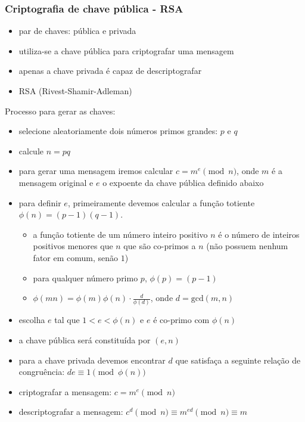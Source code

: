 \begin{frame}
\frametitle{Criptografia de chave pública - RSA}
\begin{itemize}
\item par de chaves: pública e privada
\item utiliza-se a chave pública para criptografar uma mensagem
\item apenas a chave privada é capaz de descriptografar
\item RSA (Rivest-Shamir-Adleman) 
\end{itemize}

\framebreak

Processo para gerar as chaves:
\begin{itemize}
\item selecione aleatoriamente dois números primos grandes: $p$ e $q$
\item calcule $n = pq$
\item para gerar uma mensagem iremos calcular $c = m^e \pmod{n}$, onde
$m$ é a mensagem original e $e$ o expoente da chave pública definido abaixo
\item para definir $e$, primeiramente devemos calcular a função totiente $\phi(n) = (p-1)(q-1)$.
     \begin{itemize}
     \item a função totiente de um número inteiro positivo $n$ é o número de inteiros positivos menores que $n$ que são co-primos a $n$ 
     (não possuem nenhum fator em comum, senão $1$)
     \item para qualquer número primo $p$, $\phi(p) = (p-1)$
     \item $\phi(mn) = \phi(m) \phi(n) \cdot \frac{d}{\phi(d)}$, onde $d = \text{gcd}(m,n)$
     \end{itemize}
\item escolha $e$ tal que $1 < e < \phi(n)$ e $e$ é co-primo com $\phi(n)$
\item a chave pública será constituída por $(e,n)$
\item para a chave privada devemos encontrar $d$ que satisfaça a seguinte relação de congruência: $de \equiv 1 \pmod{\phi(n)}$
\item criptografar a mensagem: $c = m^e \pmod{n}$
\item descriptografar a mensagem: $c^d \pmod n \equiv m^{ed} \pmod n \equiv m$
\end{itemize}

\framebreak


\end{frame}
